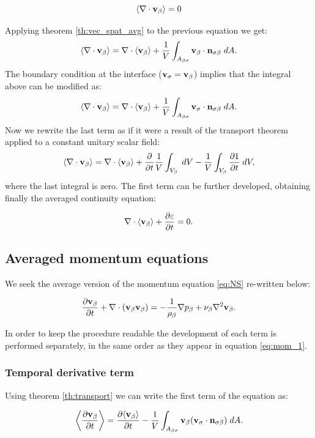 \begin{equation}
{\left< \nabla \cdot \textbf{v}_{\beta}\right>}   = 0
\label{eq:superf_avg_cont}
\end{equation}

\noindent Applying theorem \eqref{th:vec_spat_avg} to the previous equation we get:
$$
{\left< \nabla \cdot \textbf{v}_{\beta} \right>} = \nabla \cdot {\left< \textbf{v}_{\beta}\right>} + \dfrac{1}{V} \int_{A_{\beta \sigma}}  \textbf{v}_{\beta} \cdot \mathbf{n}_{\sigma \beta} \;dA.
$$
The boundary condition at the interface ($\textbf{v}_{\sigma} = \textbf{v}_{\beta}$) implies that the integral above can be modified as: 
$${\left< \nabla \cdot \textbf{v}_{\beta} \right>}=\nabla \cdot {\left< \textbf{v}_{\beta}\right>} + \dfrac{1}{V} \int_{A_{\beta \sigma}}  \textbf{v}_{\sigma} \cdot \mathbf{n}_{\sigma \beta} \;dA. $$
Now we rewrite the last term as if it were a result of the transport theorem applied to a constant unitary scalar field:
$${\left< \nabla \cdot \textbf{v}_{\beta} \right>}=\nabla \cdot {\left< \textbf{v}_{\beta}\right>} + \dfrac{\partial }{\partial t} \dfrac{1}{V} \int_{V_\beta} \;dV  - \dfrac{1}{V} \int_{V_\beta} \dfrac{\partial 1}{\partial t} \;dV, $$
where the last integral is zero. The first term can be further developed, obtaining finally the averaged continuity equation:

\begin{equation}
\nabla \cdot {\left< \textbf{v}_{\beta}\right>} + \dfrac{\partial \varepsilon}{\partial t} =0.
\label{eq:avg_1}
\end{equation}


\subsection{Averaged momentum equations}
We seek the average version of the momentum equation \eqref{eq:NS} re-written below:

\begin{equation}
\dfrac{\partial \textbf{v}_{\beta}}{\partial t} + \nabla \cdot (\textbf{v}_{\beta}\textbf{v}_{\beta}) = -\frac{1}{\rho_{\beta}} \nabla p_{\beta} + \nu_{\beta} \nabla^2  \textbf{v}_{\beta}.
\label{eq:mom_1}
\end{equation}

In order to keep the procedure readable the development of each term is performed separately, in the same order as they appear in equation \eqref{eq:mom_1}.

\subsubsection{Temporal derivative term}
Using theorem \eqref{th:transport} we can write the first term of the equation as:

\begin{equation}
{\left< \dfrac{\partial \textbf{v}_{\beta}}{\partial t} \right>} = \dfrac{\partial {\left< \textbf{v}_{\beta}\right>}}{\partial t} -\dfrac{1}{V} \int_{A_{\beta \sigma}}  \textbf{v}_{\beta} (\textbf{v}_{\sigma} \cdot \mathbf{n}_{\sigma \beta} )\;dA.
\end{equation}

